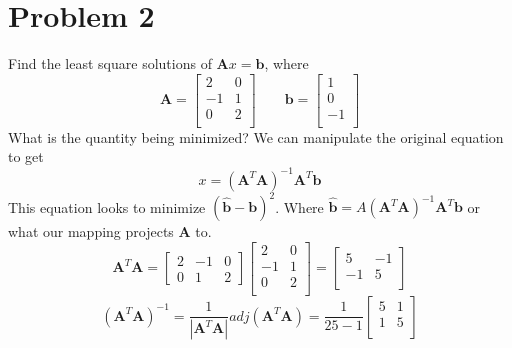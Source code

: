 \documentclass{article}
\begin{document}
\section*{Problem 2}
Find the least square solutions of $\mathbf{A}x=\mathbf{b}$, where
$$
\mathbf{A}
=
\begin{bmatrix}
2 & 0  \\
-1 & 1 \\
0 & 2  \\
\end{bmatrix}
\qquad
\mathbf{b}
=
\begin{bmatrix}
1  \\
0  \\
-1 \\
\end{bmatrix}
$$
What is the quantity being minimized?
\newline
\newline
We can manipulate the original equation to get
$$ x = (\mathbf{A}^T\mathbf{A})^{-1}\mathbf{A}^T\mathbf{b} $$
This equation looks to minimize $(\hat{\mathbf{b}} - \mathbf{b})^2$.
Where $\hat{\mathbf{b}} = A(\mathbf{A}^T\mathbf{A})^{-1}\mathbf{A}^T\mathbf{b}$ or what our mapping projects $\mathbf{A}$ to.
$$
\mathbf{A}^T\mathbf{A}
=
\begin{bmatrix}
2 & -1 & 0 \\
0 &  1 & 2
\end{bmatrix}
\begin{bmatrix}
2 & 0  \\
-1 & 1 \\
0 & 2  \\
\end{bmatrix}
=
\begin{bmatrix}
5 & -1 \\
-1 & 5 \\
\end{bmatrix}
$$
$$
(\mathbf{A}^T\mathbf{A})^{-1}
=
\frac{1}{|\mathbf{A}^T\mathbf{A}|}adj(\mathbf{A}^T\mathbf{A})
=\frac{1}{25-1}
\begin{bmatrix}
5 & 1 \\
1 & 5 \\
\end{bmatrix}
$$
\end{document}

